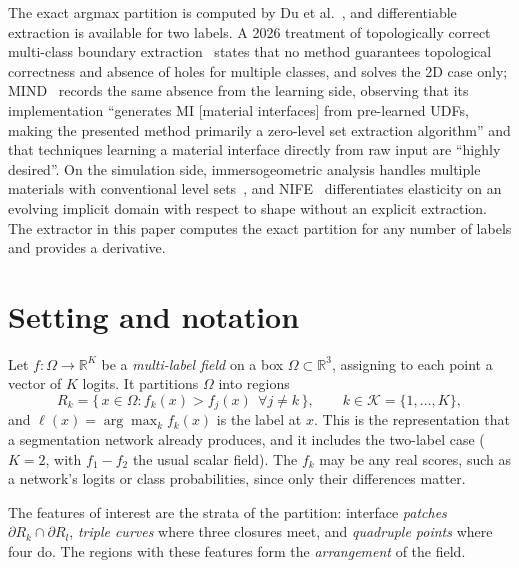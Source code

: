 \documentclass{egpubl}
\theoremstyle{definition}
\newcommand{\R}{\mathbb{R}}
\newcommand{\lab}{\ell}
\newcommand{\labels}{\mathcal{K}}
\newcommand{\region}[1]{R_{#1}}
\begin{document}
The exact argmax partition is computed by Du et
al.~\cite{du2022}, and differentiable extraction is available for two labels.
A 2026 treatment of topologically correct multi-class boundary
extraction~\cite{vira2026} states that no method guarantees topological
correctness and absence of holes for multiple classes, and solves the 2D case
only; MIND~\cite{mind2025} records the same absence from the learning side,
observing that its implementation ``generates MI [material interfaces] from pre-learned UDFs, making
the presented method primarily a zero-level set extraction algorithm'' and
that techniques learning a material interface directly from raw input are
``highly desired''. On the simulation side, immersogeometric analysis handles
multiple materials with conventional level sets~\cite{fromm2025}, and
NIFE~\cite{nife2024} differentiates elasticity on an evolving implicit domain
with respect to shape without an explicit extraction. The extractor in this
paper computes the exact partition for any number of labels and provides a
derivative.


\section{Setting and notation}
\label{sec:setting}

Let $f : \Omega \to \R^K$ be a \emph{multi-label field} on a box
$\Omega \subset \R^3$, assigning to each point a vector of $K$ logits. It
partitions $\Omega$ into regions
\[
  \region{k} = \{\, x \in \Omega : f_k(x) > f_j(x) \ \ \forall j \neq k \,\},
  \qquad k \in \labels = \{1,\dots,K\},
\]
and $\lab(x) = \arg\max_k f_k(x)$ is the label at $x$. This is the
representation that a segmentation network already produces, and it includes
the two-label case ($K=2$, with $f_1 - f_2$ the usual scalar field). The $f_k$
may be any real scores, such as a network's logits or class probabilities,
since only their differences matter.

The features of interest are the strata of the partition: interface
\emph{patches} $\partial\region{k} \cap \partial\region{l}$, \emph{triple
curves} where three closures meet, and \emph{quadruple points} where four do.
The regions with these features form the \emph{arrangement} of the field.
\end{document}
